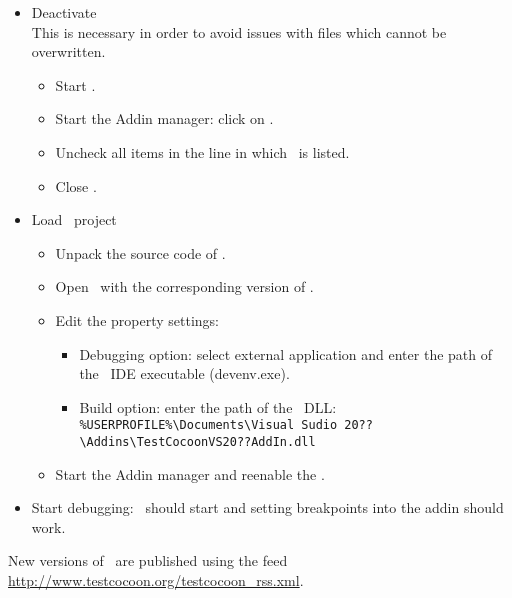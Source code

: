 \begin{itemize}
  \item Deactivate \VisualStudioVsAddIn\\
        This is necessary in order to avoid issues with files which cannot be overwritten.
        \begin{itemize}
          \item Start \VisualStudio.
          \item Start the Addin manager: click on .
          \item Uncheck all items in the line in which \TestCocoon\ is listed.
          \item Close \VisualStudio.
        \end{itemize}
  \item Load \VisualStudioVsAddIn\ project\\
        \begin{itemize}
          \item Unpack the source code of \TestCocoon.
          \item Open \VisualStudioVsAddIn\ with the corresponding version of \VisualStudio.
          \item Edit the property settings:
          \begin{itemize}
            \item Debugging option: select external application and enter the path of the \VisualStudio\ IDE executable (devenv.exe).
            \item Build option: enter the path of the \VisualStudioVsAddIn\ DLL: \verb$%USERPROFILE%\Documents\Visual Sudio 20??\Addins\TestCocoonVS20??AddIn.dll$
          \end{itemize}
          \item Start the Addin manager and reenable the \VisualStudioVsAddIn.

        \end{itemize}
      \item Start debugging: \VisualStudio\ should start and setting breakpoints into the addin should work.
     
\end{itemize}


New versions of \TestCocoon\ are published using the  feed \url{http://www.testcocoon.org/testcocoon_rss.xml}.
